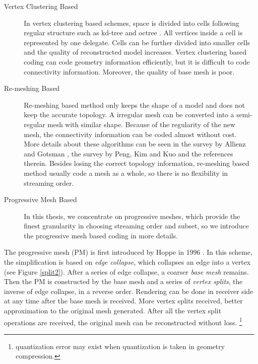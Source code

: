 \documentclass[11pt, a4paper]{report}
\begin{document}
    \begin{description}
        \item[Vertex Clustering Based] 
            In vertex clustering based schemes, space is divided into cells
            following regular structure such as kd-tree \cite{566591} and 
            octree \cite{1073237}. All vertices inside a cell is represented
            by one delegate. Cells can be further divided into smaller cells
            and the quality of reconstructed model increases. Vertex clustering
            based coding can code geometry information efficiently, but it is 
            difficult to code connectivity information. Moreover, the quality
            of base mesh is poor.

        \item[Re-meshing Based]
            Re-meshing based method only keeps the shape of a model
            and does not keep the accurate topology. 
            A irregular mesh can be converted into a semi-regular mesh
            with similar shape. 
            Because of the regularity of the new mesh,
            the connectivity information can be coded almost without cost.
            More details about these algorithms can be seen in the survey by Allienz and Gotsman
            \cite{recent:alliez}, the survey by Peng, Kim and Kuo
            \cite{technologies:peng} and the references therein.
            Besides losing the correct topology information,
            re-meshing based method usually code a mesh as a whole, 
            so there is no flexibility in streaming order.

        \item[Progressive Mesh Based]
            In this thesis, we concentrate on progressive meshes, which provide 
            the finest granularity in choosing streaming order and subset, 
            so we introduce the progressive mesh based coding in more details.
    \end{description}

    The progressive mesh (PM) \label{progressive_mesh}is first
    introduced by Hoppe in 1996 \cite{hoppe96progressive}. In this
    scheme, the simplification is based on \emph{edge collapse}, which
    collapses an edge into a vertex (see Figure \ref{split2}).
    After a series of edge collapse, a coarser \emph{base mesh} remains. 
    Then the PM is constructed by the base mesh and a series of \emph{vertex
    splits}, the inverse of edge collapse, in a reverse order.
    Rendering can be done in receiver side at any time after the base
    mesh is received. More vertex splits received, better
    approximation to the original mesh generated. After all
    the vertex split operations are received, the original mesh can be
    reconstructed without loss. \footnote{quantization error may exist
    when quantization is taken in geometry compression.}
\end{document}
